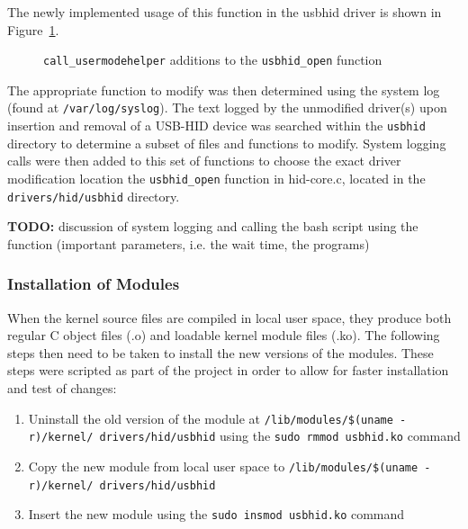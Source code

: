 \documentclass[pagenumbers]{ieee}
\begin{document}
The newly implemented usage of this function in the usbhid driver is shown in Figure~\ref{fig:usermodehelper_code}.

\begin{figure}[H]
   \caption{\texttt{call\_usermodehelper} additions to the \texttt{usbhid\_open} function}
   \label{fig:usermodehelper_code}
\end{figure}

The appropriate function to modify was then determined using the system log (found at \texttt{/var/log/syslog}). The text logged by the unmodified driver(s) upon insertion and removal of a USB-HID device was searched within the \texttt{usbhid} directory to determine a subset of files and functions to modify. System logging calls were then added to this set of functions to choose the exact driver modification location \textemdash the \texttt{usbhid\_open} function in hid-core.c, located in the \texttt{drivers/hid/usbhid} directory.

\textbf{TODO:} discussion of system logging and calling the bash script using the function (important parameters, i.e. the wait time, the programs)

\subsubsection{Installation of Modules}

When the kernel source files are compiled in local user space, they produce both regular C object files (.o) and loadable kernel module files (.ko). The following steps then need to be taken to install the new versions of the modules. These steps were scripted as part of the project in order to allow for faster installation and test of changes:

\begin{enumerate}
\item Uninstall the old version of the module at \texttt{/lib/modules/\$(uname -r)/kernel/ drivers/hid/usbhid} using the \texttt{sudo rmmod usbhid.ko} command
\item Copy the new module from local user space to \texttt{/lib/modules/\$(uname -r)/kernel/ drivers/hid/usbhid}
\item Insert the new module using the \texttt{sudo insmod usbhid.ko} command
\end{enumerate} 
\end{document}
